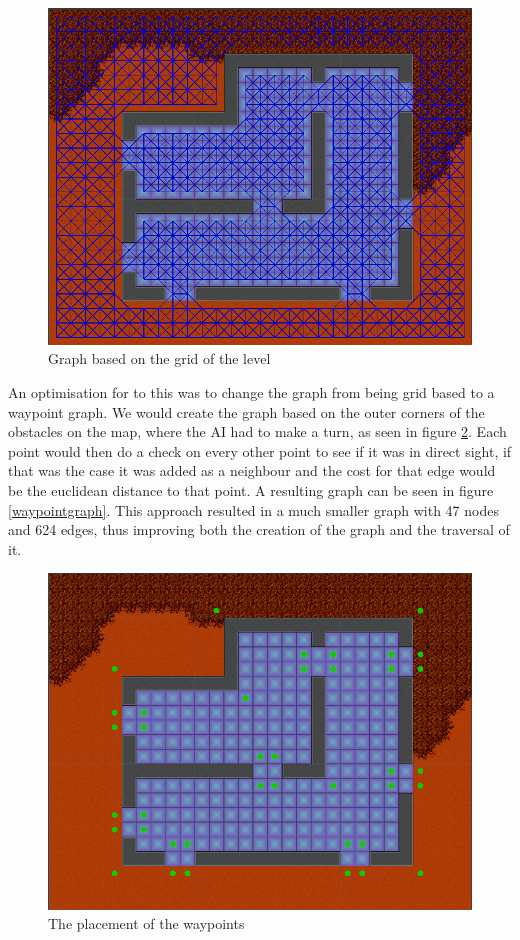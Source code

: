 \begin{figure}[H]
	\includegraphics[width=\textwidth]{figures/astar/gridGraph}
	\caption{Graph based on the grid of the level}
	\label{gridGraph}
\end{figure}

An optimisation for to this was to change the graph from being grid based to a waypoint graph.
We would create the graph based on the outer corners of the obstacles on the map, where the AI had to make a turn, as seen in figure \ref{waypointsNode}.
Each point would then do a check on every other point to see if it was in direct sight, if that was the case it was added as a neighbour and the cost for that edge would be the euclidean distance to that point.
A resulting graph can be seen in figure \ref{waypointgraph}.
This approach resulted in a much smaller graph with 47 nodes and 624 edges, thus improving both the creation of the graph and the traversal of it.

\begin{figure}[H]
	\includegraphics[width=\textwidth]{figures/astar/waypoints}
	\caption{The placement of the waypoints}
	\label{waypointsNode}
\end{figure}

